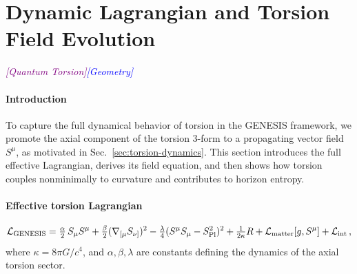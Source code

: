 \documentclass{article}
\newcommand{\Splanck}{\ensuremath{S_{\mathrm{Pl}}}}
\newcommand{\geometrytag}{\textcolor{blue}{\textit{[Geometry]}}}
\newcommand{\quantumtag}{\textcolor{purple}{\textit{[Quantum Torsion]}}}
\begin{document}
\medskip
\begin{center}
\end{center}
\medskip








\section{Dynamic Lagrangian and Torsion Field Evolution}
\label{sec:dynamic-lagrangian}
\quantumtag  \geometrytag


\paragraph{Introduction}
To capture the full dynamical behavior of torsion in the GENESIS framework, we promote the axial component of the torsion 3-form to a propagating vector field \(S^\mu\), as motivated in Sec.~\ref{sec:torsion-dynamics}. This section introduces the full effective Lagrangian, derives its field equation, and then shows how torsion couples nonminimally to curvature and contributes to horizon entropy.

\paragraph{Effective torsion Lagrangian}
\begin{equation}\label{eq:full-lagrangian}
  \mathcal L_{\rm GENESIS}
    = \tfrac{\alpha}{2}\,S_\mu S^\mu
    + \tfrac{\beta}{2} (\nabla_{[\mu} S_{\nu]})^2
    - \tfrac{\lambda}{4}(S^\mu S_\mu - \Splanck^2)^2
    + \tfrac1{2\kappa}R
    + \mathcal L_{\rm matter}[g,S^\mu]
    + \mathcal L_{\rm int}\,,
\end{equation}
where \(\kappa=8\pi G/c^4\), and \(\alpha, \beta, \lambda\) are constants defining the dynamics of the axial torsion sector.
\end{document}
